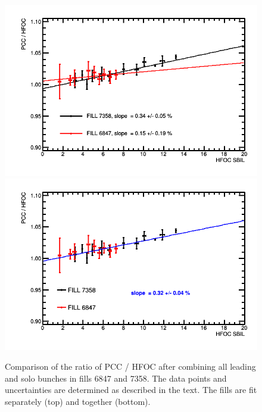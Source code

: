 \clearpage
\begin{figure}[t]
  \begin{center}
    \includegraphics[width=0.7\linewidth]{plots/sbilratios_singles_combined/compareFills_graph_fillstogether.png}
    \includegraphics[width=0.7\linewidth]{plots/sbilratios_singles_combined/compareFills_graph_fillstogether_onefit.png}
    \caption{
      Comparison of the ratio of PCC / HFOC after combining all leading and solo bunches in fills 6847 and 7358.
      The data points and uncertainties are determined as described in the text.
      The fills are fit separately (top) and together (bottom).
      \label{fig:sbilratiosresultscombined}
    }
  \end{center}
\end{figure}


